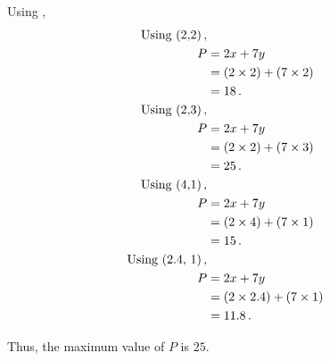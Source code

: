 \begin{subquestions}
\begin{subsubquestions}

\subsubquestion

Using ,
\begin{align}
	\text{Using (2,2)} \,, \nonumber \\
	P & = 2x + 7y  \nonumber \\
	& = (2 \times 2) + (7 \times 2)  \nonumber \\
	& = 18 \,. \\
	\text{Using (2,3)} \,, \nonumber \\
	P & = 2x + 7y  \nonumber \\
	& = (2 \times 2) + (7 \times 3) \nonumber \\
	& = 25 \,. \\  \label{2012:q1:eqn:Profit}	  
	\text{Using (4,1)} \,, \nonumber \\
	P & = 2x + 7y  \nonumber \\
	& = (2 \times 4) + (7 \times 1)  \nonumber \\
	& = 15 \,.  \\
	\text{Using (2.4, 1)} \,, \nonumber \\
	P & = 2x + 7y  \nonumber \\
	& = (2 \times 2.4) + (7 \times 1)  \nonumber \\
	& = 11.8 \,. 
\end{align}

Thus, the maximum value of $P$ is $25$.

\end{subsubquestions}

\end{subquestions}

